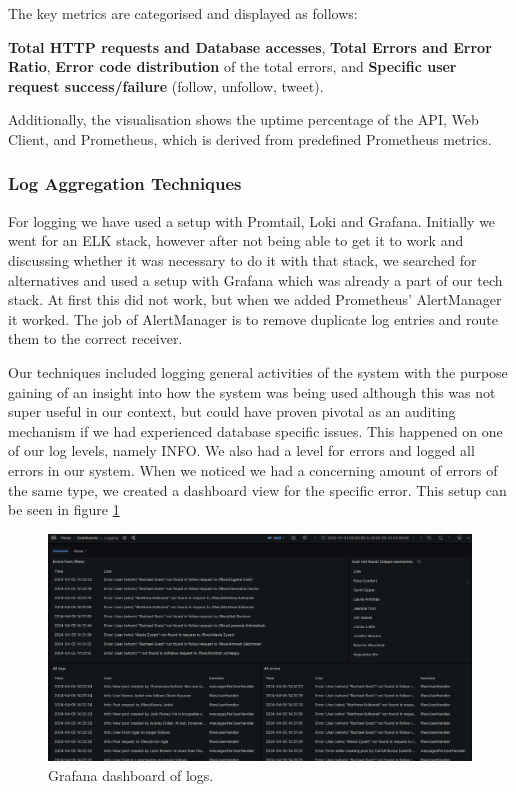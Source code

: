 The key metrics are categorised and displayed as follows:

\textbf{Total HTTP requests and Database accesses}, \textbf{Total Errors and Error Ratio}, \textbf{Error code distribution} of the total errors, and \textbf{Specific user request success/failure} (follow, unfollow, tweet). 

Additionally, the visualisation shows the uptime percentage of the API, Web Client, and Prometheus, which is derived from predefined Prometheus metrics.

\subsubsection*{Log Aggregation Techniques}
For logging we have used a setup with Promtail, Loki and Grafana. Initially we went for an ELK stack, however after not being able to get it to work and discussing whether it was necessary to do it with that stack, we searched for alternatives and used a setup with Grafana which was already a part of our tech stack. At first this did not work, but when we added Prometheus' AlertManager it worked. The job of AlertManager is to remove duplicate log entries and route them to the correct receiver.

Our techniques included logging general activities of the system with the purpose gaining of an insight into how the system was being used although this was not super useful in our context, but could have proven pivotal as an auditing mechanism if we had experienced database specific issues. This happened on one of our log levels, namely INFO. We also had a level for errors and logged all errors in our system. When we noticed we had a concerning amount of errors of the same type, we created a dashboard view for the specific error. This setup can be seen in figure \ref{fig:logging}

\begin{figure}[H]
    \centering
    \includegraphics[width=\textwidth]{images/logging.png}
    \caption{Grafana dashboard of logs.}
    \label{fig:logging}
\end{figure}



